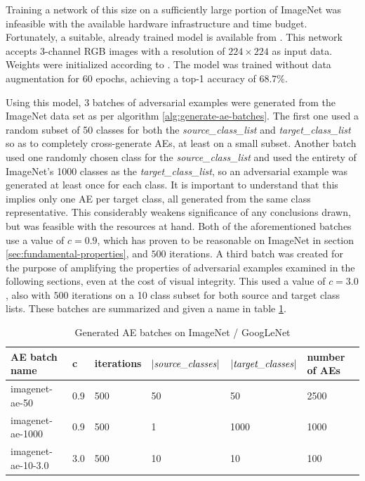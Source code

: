 \documentclass[11pt, a4paper]{article}
\newcommand{\abs}[1]{\left\lvert#1\right\rvert}
\begin{document}
Training a network of this size on a sufficiently large portion of ImageNet was infeasible with the available hardware infrastructure and time budget. Fortunately, a suitable, already trained model is available from \cite{caffe-model-zoo}. This network accepts 3-channel RGB images with a resolution of $224 \times 224$ as input data. Weights were initialized according to \cite{glorot-understanding-deep-nn-training}. The model was trained without data augmentation for 60 epochs, achieving a top-1 accuracy of $68.7\%$.

Using this model, 3 batches of adversarial examples were generated from the ImageNet data set as per algorithm \ref{alg:generate-ae-batches}. The first one used a random subset of 50 classes for both the \emph{source\_class\_list} and \emph{target\_class\_list} so as to completely cross-generate AEs, at least on a small subset. Another batch used one randomly chosen class for the \emph{source\_class\_list} and used the entirety of ImageNet's 1000 classes as the \emph{target\_class\_list}, so an adversarial example was generated at least once for each class. It is important to understand that this implies only one AE per target class, all generated from the same class representative. This considerably weakens significance of any conclusions drawn, but was feasible with the resources at hand. Both of the aforementioned batches use a value of $c = 0.9$, which has proven to be reasonable on ImageNet in section \ref{sec:fundamental-properties}, and $500$ iterations. A third batch was created for the purpose of amplifying the properties of adversarial examples examined in the following sections, even at the cost of visual integrity. This used a value of $c = 3.0$, also with $500$ iterations on a 10 class subset for both source and target class lists. These batches are summarized and given a name in table \ref{tab:imagenet-ae-batches}.

\begin{table}[h!tb]
	\centering
	\begin{tabular}{|l|l|l|l|l|l|}
	\hline
		AE batch name & c & iterations & $\abs{\text{\emph{source\_classes}}}$ & $\abs{\text{\emph{target\_classes}}}$ & number of AEs \\
		\hline
		imagenet-ae-50 & 0.9 & 500 & 50 & 50 & 2500 \\
		imagenet-ae-1000 & 0.9 & 500 & 1 & 1000 & 1000 \\
		imagenet-ae-10-3.0 & 3.0 & 500 & 10 & 10 & 100 \\
	\hline
	\end{tabular}
	\caption[Description of AE batches generated on ImageNet / GoogLeNet]{Generated AE batches on ImageNet / GoogLeNet}
	\label{tab:imagenet-ae-batches}
\end{table}
\end{document}
